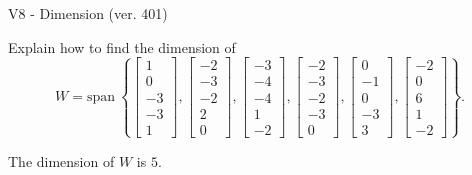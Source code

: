 \begin{exercise}
  \begin{exerciseTitle}V8 - Dimension (ver. 401)\end{exerciseTitle}
  \begin{exerciseStatement}
    Explain how to find the dimension of 
\[W=\mathrm{span}\ \left\{\left[\begin{array}{r}
1 \\
0 \\
-3 \\
-3 \\
1
\end{array}\right] , \left[\begin{array}{r}
-2 \\
-3 \\
-2 \\
2 \\
0
\end{array}\right] , \left[\begin{array}{r}
-3 \\
-4 \\
-4 \\
1 \\
-2
\end{array}\right] , \left[\begin{array}{r}
-2 \\
-3 \\
-2 \\
-3 \\
0
\end{array}\right] , \left[\begin{array}{r}
0 \\
-1 \\
0 \\
-3 \\
3
\end{array}\right] , \left[\begin{array}{r}
-2 \\
0 \\
6 \\
1 \\
-2
\end{array}\right]\right\}.\]



  \end{exerciseStatement}
  \begin{exerciseAnswer}
   The dimension of \(W\) is  \(5\).
  


  \end{exerciseAnswer}
\end{exercise}